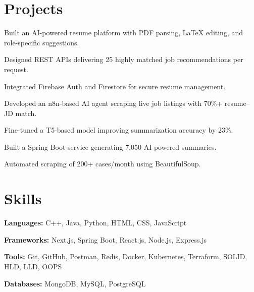 \documentclass[]{deedy-resume-reversed}
\begin{document}
\section{Projects}

\begin{tightemize}
\item Built an AI-powered resume platform with PDF parsing, LaTeX editing, and role-specific suggestions.
\item Designed REST APIs delivering 25 highly matched job recommendations per request.
\item Integrated Firebase Auth and Firestore for secure resume management.
\item Developed an n8n-based AI agent scraping live job listings with 70\%+ resume–JD match.
\end{tightemize}
\sectionsep

\begin{tightemize}
\item Fine-tuned a T5-based model improving summarization accuracy by 23\%.
\item Built a Spring Boot service generating 7,050 AI-powered summaries.
\item Automated scraping of 200+ cases/month using BeautifulSoup.
\end{tightemize}
\sectionsep

\section{Skills}

\begin{tightemize}
\item \textbf{Languages:} C++, Java, Python, HTML, CSS, JavaScript
\item \textbf{Frameworks:} Next.js, Spring Boot, React.js, Node.js, Express.js
\item \textbf{Tools:} Git, GitHub, Postman, Redis, Docker, Kubernetes, Terraform, SOLID, HLD, LLD, OOPS
\item \textbf{Databases:} MongoDB, MySQL, PostgreSQL
\end{tightemize}
\end{document}
